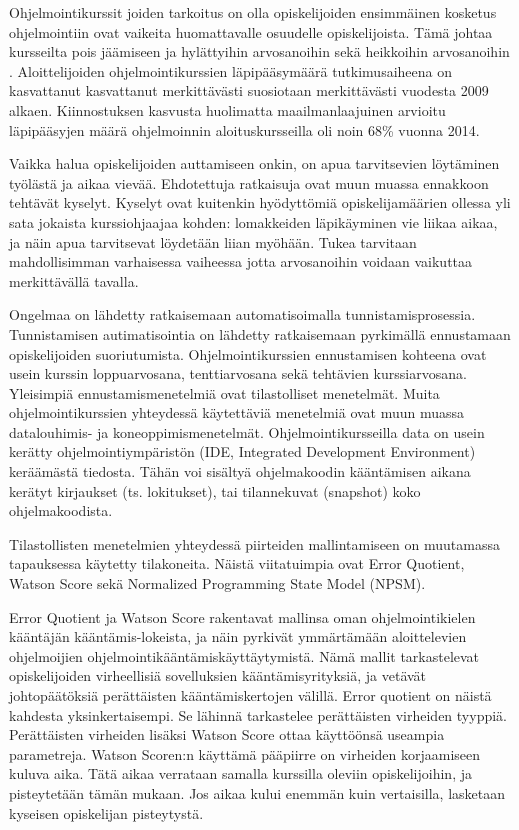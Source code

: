 \documentclass[finnish,twoside,openright]{HYgraduMLDS}
\begin{document}
Ohjelmointikurssit joiden tarkoitus on olla opiskelijoiden ensimmäinen kosketus ohjelmointiin ovat vaikeita huomattavalle osuudelle opiskelijoista. Tämä johtaa kursseilta pois jäämiseen ja hylättyihin arvosanoihin sekä heikkoihin arvosanoihin \cite{bergin2015using}. Aloittelijoiden ohjelmointikurssien läpipääsymäärä tutkimusaiheena on kasvattanut kasvattanut merkittävästi suosiotaan merkittävästi vuodesta 2009 alkaen\cite{hellas2018predicting}. Kiinnostuksen kasvusta huolimatta maailmanlaajuinen arvioitu läpipääsyjen määrä ohjelmoinnin aloituskursseilla oli noin 68\% vuonna 2014\cite{watson2014failure}. 

Vaikka halua opiskelijoiden auttamiseen onkin, on apua tarvitsevien löytäminen työlästä ja aikaa vievää. Ehdotettuja ratkaisuja ovat muun muassa ennakkoon tehtävät kyselyt\cite{watson2014no}. %
Kyselyt ovat kuitenkin hyödyttömiä opiskelijamäärien ollessa yli sata jokaista kurssiohjaajaa kohden: lomakkeiden läpikäyminen vie liikaa aikaa, ja näin apua tarvitsevat löydetään liian myöhään. Tukea tarvitaan mahdollisimman varhaisessa vaiheessa jotta arvosanoihin voidaan vaikuttaa merkittävällä tavalla\cite{bergin2015using}. 

Ongelmaa on lähdetty ratkaisemaan automatisoimalla tunnistamisprosessia. Tunnistamisen autimatisointia on lähdetty ratkaisemaan pyrkimällä ennustamaan opiskelijoiden suoriutumista. Ohjelmointikurssien ennustamisen kohteena ovat usein kurssin loppuarvosana, tenttiarvosana sekä tehtävien kurssiarvosana. Yleisimpiä ennustamismenetelmiä ovat tilastolliset menetelmät\cite{hellas2018predicting}. Muita ohjelmointikurssien yhteydessä käytettäviä menetelmiä ovat muun muassa datalouhimis- ja koneoppimismenetelmät. Ohjelmointikursseilla data on usein kerätty ohjelmointiympäristön (IDE, Integrated Development Environment) keräämästä tiedosta. Tähän voi sisältyä ohjelmakoodin kääntämisen aikana kerätyt kirjaukset (ts. lokitukset), tai tilannekuvat (snapshot) koko ohjelmakoodista\cite{watson2013predicting, jadud2006methods, lagus2018transfer}.

Tilastollisten menetelmien yhteydessä piirteiden mallintamiseen on muutamassa tapauksessa käytetty tilakoneita. Näistä viitatuimpia ovat Error Quotient\cite{jadud2006methods}, Watson Score\cite{watson2013predicting} sekä Normalized Programming State Model (NPSM)\cite{carter2015normalized}. 

Error Quotient ja Watson Score rakentavat mallinsa oman ohjelmointikielen kääntäjän kääntämis-lokeista, ja näin pyrkivät ymmärtämään aloittelevien ohjelmoijien ohjelmointikääntämiskäyttäytymistä. Nämä mallit tarkastelevat opiskelijoiden virheellisiä sovelluksien kääntämisyrityksiä, ja vetävät johtopäätöksiä perättäisten kääntämiskertojen välillä. Error quotient on näistä kahdesta yksinkertaisempi. Se lähinnä tarkastelee perättäisten virheiden tyyppiä. Perättäisten virheiden lisäksi Watson Score ottaa käyttöönsä useampia parametreja. Watson Scoren:n käyttämä pääpiirre on virheiden korjaamiseen kuluva aika. Tätä aikaa verrataan samalla kurssilla oleviin opiskelijoihin, ja pisteytetään tämän mukaan. Jos aikaa kului enemmän kuin vertaisilla, lasketaan kyseisen opiskelijan pisteytystä.
\end{document}
